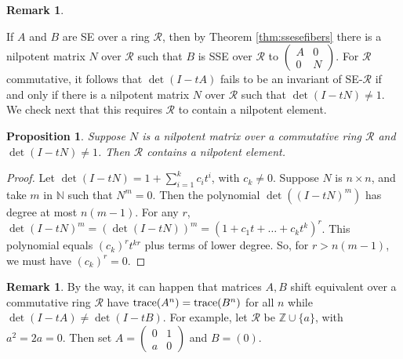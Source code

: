 \documentclass{amsart}
\newtheorem{prop}[equation]{Proposition}
\theoremstyle{definition}
\newtheorem{rem}[equation]{Remark}
\theoremstyle{definition}
\newcommand{\Z}{\mathbb Z}
\newcommand{\N}{\mathbb N}
\newcommand{\tr}{\textnormal{trace}}
\numberwithin{equation}{subsection}
\begin{document}
\begin{rem} \label{reducedrings}

If $A$ and $B$ are SE over a ring $\mathcal R$, then
by Theorem \ref{thm:ssesefibers} there is a nilpotent matrix $N$ over $\mathcal R$
such that $B$ is SSE over $\mathcal R$ to
$\left( \begin{smallmatrix} A & 0 \\ 0 & N \end{smallmatrix} \right)$.
For $\mathcal R$ commutative, it follows that
$\det(I-tA)$ fails to be
an invariant of SE-$\mathcal R$  if and only if there is a
nilpotent matrix $N$ over $\mathcal R$ such that $\det(I-tN) \neq 1$.
We check next that this requires $\mathcal R$ to contain a nilpotent
element.

\begin{prop} \label{nilpotentelementsprop}
Suppose $N$ is a nilpotent matrix over a commutative ring $\mathcal R$ and
$\det (I-tN) \neq 1$. Then $\mathcal R$ contains a nilpotent element.
\end{prop}
\begin{proof}
Let $\det(I-tN) = 1 + \sum_{i=1}^k c_it^i$, with $c_k \neq 0$.
Suppose $N$ is $n\times n$, and take $m$ in $\N$ such that $N^m = 0$. Then
the polynomial $\det((I-tN)^m)$ has degree at most $n(m-1)$.
For any $r$, $\det(I-tN)^m = (\det(I-tN))^m = (1 + c_1t+ \dots + c_kt^k)^r$.
This polynomial equals $(c_k)^rt^{kr}$ plus terms of lower degree.
So, for $r > n(m-1)$, we must have $(c_k)^r=0$.
\end{proof}
\end{rem}

\begin{rem}
By the way, it can happen that  matrices $A,B$
shift equivalent over a commutative ring $\mathcal R$ have $\tr (A^n)=\tr (B^n)$ for all $n$
while $\det (I-tA) \neq \det (I-tB)$. For example, let $\mathcal R$
be $\Z \cup \{a\}$, with $a^2=2a=0$. Then set
$A= \left( \begin{smallmatrix} 0 & 1 \\ a & 0 \end{smallmatrix} \right)$
and $B=(0)$.
\end{rem}
\end{document}
